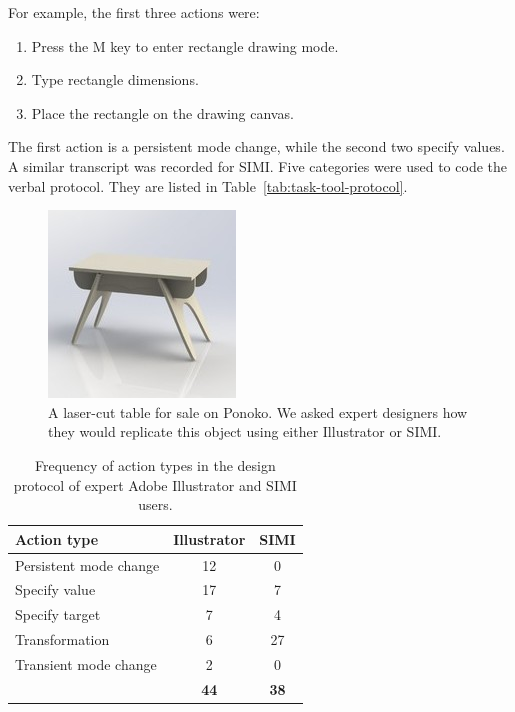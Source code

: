 \begin{samepage}
For example, the first three actions were:

\begin{enumerate}
\item Press the M key to enter rectangle drawing mode.
\item Type rectangle dimensions.
\item Place the rectangle on the drawing canvas.
\end{enumerate}
\end{samepage}

The first action is a persistent mode change, while the second two
specify values. A similar transcript was recorded for SIMI. Five
categories were used to code the verbal protocol. They are listed in
Table~\ref{tab:task-tool-protocol}.



\begin{figure}[h]
  \centering
  \includegraphics[width=0.4\linewidth]{img/table.jpg}
  \caption[Laser-cut Table Sold on Ponoko]{A laser-cut table for sale
    on Ponoko. We asked expert designers how they would replicate this
    object using either Illustrator or SIMI.}
  \label{fig:table}
\end{figure}

\begin{table}[h]
  \centering
  \begin{tabular}{ l c c }
    \textbf{Action type} & \textbf{Illustrator} & \textbf{SIMI} \\
    \hline
    Persistent mode change & 12 & 0 \\
    Specify value & 17 & 7 \\
    Specify target & 7 & 4 \\
    Transformation & 6 & 27 \\
    Transient mode change & 2 & 0 \\
    \hline
    & \textbf{44} & \textbf{38} \\
  \end{tabular}
  \caption[Action type frequency]{Frequency of action types in the
    design protocol of expert Adobe Illustrator and SIMI users. }
  \label{tab:expert}
\end{table}

